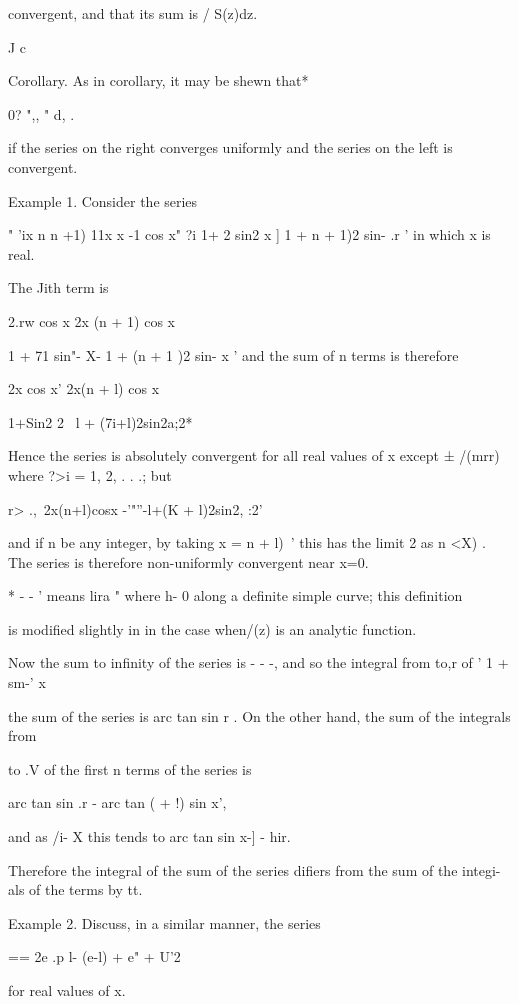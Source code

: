 convergent, and that its sum is / S(z)dz.

J c

Corollary. As in  corollary, it may be shewn that*

0? ",, " d, .

if the series on the right converges uniformly and the series on the
left is convergent.

Example 1. Consider the series

" 'ix n n +1) 11x x -1 cos x" ?i 1+ 2 sin2 x ] 1 + n + 1)2 sin- .r '
in which x is real.

The Jith term is

2.rw cos x 2x (n + 1) cos x

1 + 71 sin"- X- 1 + (n + 1 )2 sin- x ' and the sum of n terms is
therefore

2x cos x' 2x(n + l) cos x

1+Sin2 2~ l + (7i+l)2sin2a;2*

Hence the series is absolutely convergent for all real values of x
except ± /(mrr) where ?>i = 1, 2, . . .; but

r> .,\ 2x(n+l)cosx -'"''-l+(K + l)2sin2, :2'

and if n be any integer, by taking x = n + l)~' this has the limit 2
as n <X) . The series is therefore non-uniformly convergent near x=0.

* - - ' means lira " where h- 0 along a definite simple curve; this
definition

is modified slightly in  in the case when/(z) is an analytic
function.

%
%

Now the sum to infinity of the series is - - -, and so the integral
from to,r of ' 1 + sm-' x

the sum of the series is arc tan sin r . On the other hand, the sum of
the integrals from

to .V of the first n terms of the series is

arc tan sin .r - arc tan ( + !) sin x',

and as /i- X this tends to arc tan sin x-] - hir.

Therefore the integral of the sum of the series difiers from the sum
of the integi-als of the terms by tt.

Example 2. Discuss, in a similar manner, the series

== 2e .p l- (e-l) + e" + U'2

for real values of x.

